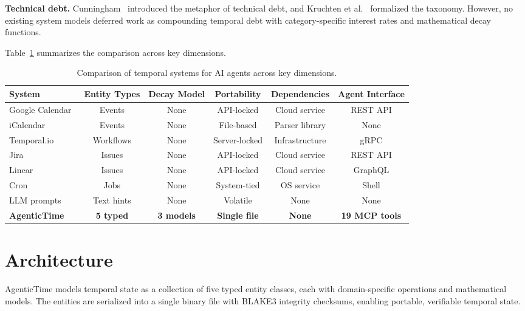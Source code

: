 \documentclass[10pt, twocolumn]{article}
\begin{document}
\textbf{Technical debt.} Cunningham~\cite{cunningham1992wycash} introduced the metaphor of technical debt, and Kruchten et al.~\cite{kruchten2012technical} formalized the taxonomy. However, no existing system models deferred work as compounding temporal debt with category-specific interest rates and mathematical decay functions.

Table~\ref{tab:related} summarizes the comparison across key dimensions.

\begin{table}[t]
\caption{Comparison of temporal systems for AI agents across key dimensions.}
\label{tab:related}
\centering
\small
\begin{tabular}{@{}lccccc@{}}
\toprule
\textbf{System} & \textbf{Entity Types} & \textbf{Decay Model} & \textbf{Portability} & \textbf{Dependencies} & \textbf{Agent Interface} \\
\midrule
Google Calendar~\cite{google_calendar_api} & Events & None & API-locked & Cloud service & REST API \\
iCalendar~\cite{ical_rfc5545} & Events & None & File-based & Parser library & None \\
Temporal.io~\cite{temporal_io_2024} & Workflows & None & Server-locked & Infrastructure & gRPC \\
Jira~\cite{jira_2024} & Issues & None & API-locked & Cloud service & REST API \\
Linear~\cite{linear_2024} & Issues & None & API-locked & Cloud service & GraphQL \\
Cron~\cite{cron_ieee} & Jobs & None & System-tied & OS service & Shell \\
LLM prompts & Text hints & None & Volatile & None & None \\
\midrule
\textbf{AgenticTime} & \textbf{5 typed} & \textbf{3 models} & \textbf{Single file} & \textbf{None} & \textbf{19 MCP tools} \\
\bottomrule
\end{tabular}
\end{table}


\section{Architecture}
\label{sec:architecture}

AgenticTime models temporal state as a collection of five typed entity classes, each with domain-specific operations and mathematical models. The entities are serialized into a single binary file with BLAKE3 integrity checksums, enabling portable, verifiable temporal state.
\end{document}
